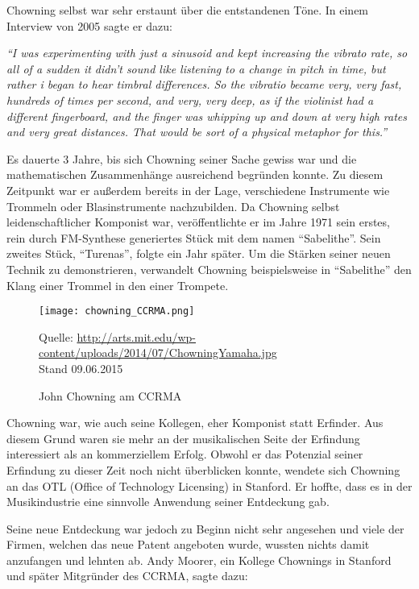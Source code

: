 Chowning selbst war sehr erstaunt über die entstandenen Töne. In einem Interview von 2005 sagte er dazu: 

\textit{``I was experimenting with just a sinusoid and kept increasing the vibrato rate, so all of a sudden it didn't sound like listening to a change in pitch in time, but rather i began to hear timbral differences. So the vibratio became very, very fast, hundreds of times per second, and very, very deep, as if the violinist had a different fingerboard, and the finger was whipping up and down at very high rates and very great distances. That would be sort of a physical metaphor for this.''}\cite[S. 34f.]{soundofinnovation}

Es dauerte 3 Jahre, bis sich Chowning seiner Sache gewiss war und die mathematischen Zusammenhänge ausreichend begründen konnte. Zu diesem Zeitpunkt war er außerdem bereits in der Lage, verschiedene Instrumente wie Trommeln oder Blasinstrumente nachzubilden. Da Chowning selbst leidenschaftlicher Komponist war, veröffentlichte er im Jahre 1971 sein erstes, rein durch FM-Synthese generiertes Stück mit dem namen ``Sabelithe''. Sein zweites Stück, ``Turenas'', folgte ein Jahr später.
Um die Stärken seiner neuen Technik zu demonstrieren, verwandelt Chowning beispielsweise in ``Sabelithe'' den Klang einer Trommel in den einer Trompete.\cite[S. 39]{soundofinnovation}
 
\begin{figure} [ht]
\centering
  \texttt{[image: chowning\_CCRMA.png]}
\caption{John Chowning am CCRMA}
\label{fig:chowningdx7}
Quelle: \url{ http://arts.mit.edu/wp-content/uploads/2014/07/ChowningYamaha.jpg} \\Stand 09.06.2015
\end{figure}
 
Chowning war, wie auch seine Kollegen, eher Komponist statt Erfinder. Aus diesem Grund waren sie mehr an der musikalischen Seite der Erfindung interessiert als an kommerziellem Erfolg. Obwohl er das Potenzial seiner Erfindung zu dieser Zeit noch nicht überblicken konnte, wendete sich Chowning an das OTL (Office of Technology Licensing) in Stanford. Er hoffte, dass es in der Musikindustrie eine sinnvolle Anwendung seiner Entdeckung gab.\cite[S. 42]{soundofinnovation}

 Seine neue Entdeckung war jedoch zu Beginn nicht sehr angesehen und viele der Firmen, welchen das neue Patent angeboten wurde, wussten nichts damit anzufangen und lehnten ab. Andy Moorer, ein Kollege Chownings in Stanford und später Mitgründer des CCRMA, sagte dazu: 

